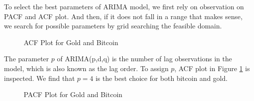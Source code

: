 \documentclass[12pt,a4paper]{article}
\begin{document}
\begin{spacing}{1.2}
To select the best parameters of ARIMA model, we first rely on observation on PACF and ACF plot. And then, if it does not fall in a range that makes sense, we search for possible parameters by grid searching the feasible domain.

\begin{figure}[htp]
	\begin{center}
		\caption{ACF Plot for Gold and Bitcoin}
		\label{fig:acf}
	\end{center}
\end{figure}

The parameter $p$ of ARIMA(p,d,q) is the number of lag observations in the model, which is also known as the lag order. To assign $p$, ACF plot in Figure \ref{fig:acf} is inspected. We find that $p=4$ is the best choice for both bitcoin and gold.

\begin{figure}[htp]
	\begin{center}
		\label{fig:pacf}
		\caption{PACF Plot for Gold and Bitcoin}
	\end{center}
\end{figure}


\end{spacing}
\end{document}
